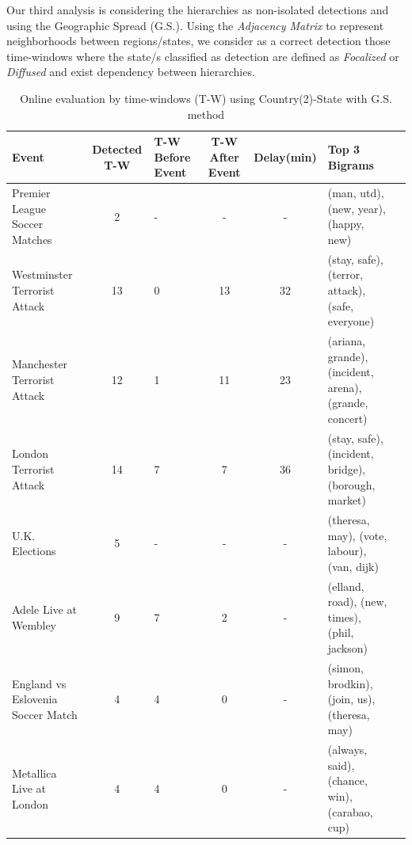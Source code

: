 \documentclass[sigconf]{acmart}
\begin{document}
Our third analysis is considering the hierarchies as non-isolated detections and using the Geographic Spread (G.S.). Using the \textit{Adjacency Matrix} to represent neighborhoods between regions/states, we consider as a correct detection those time-windows where the state/s classified as detection are defined as \textit{Focalized} or \textit{Diffused} and exist dependency between hierarchies. 
\begin{table}
	\caption{Online evaluation by time-windows (T-W) using Country(2)-State with G.S. method}
	\label{tab:online1}
	\begin{tabular}{lclccp{3.5cm}l}
		\toprule
		Event &Detected T-W & T-W Before Event & T-W After Event & Delay(min) & Top 3 Bigrams\\
		\midrule
		Premier League Soccer Matches & 2& - & - & - & \small{(man, utd), (new, year), (happy, new)} \\
		Westminster Terrorist Attack& 13 & 0 &13 & 32& \small{(stay, safe), (terror, attack), (safe, everyone)}\\
		Manchester Terrorist Attack& 12& 1& 11& 23& \small{(ariana, grande), (incident, arena), (grande, concert)}\\
		London Terrorist Attack & 14 & 7 & 7 & 36 & \small{(stay, safe), (incident, bridge), (borough, market)}\\
		U.K. Elections& 5 & - & - & - & \small{(theresa, may), (vote, labour), (van, dijk)}\\
		Adele Live at Wembley& 9& 7&2&-& \small{(elland, road), (new, times), (phil, jackson)}\\
		England vs Eslovenia Soccer Match & 4& 4 & 0 & - & \small{(simon, brodkin), (join, us), (theresa, may)}\\
		Metallica Live at London& 4 & 4 & 0 & - & \small{(always, said), (chance, win), (carabao, cup)}\\
		\bottomrule
	\end{tabular}
\end{table}
\end{document}
